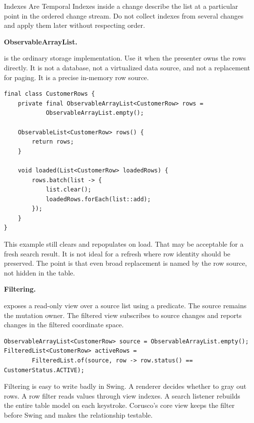 \begin{pitfallbox}{Indexes Are Temporal}
Indexes inside a change describe the list at a particular point in the ordered
change stream. Do not collect indexes from several changes and apply them later
without respecting order.
\end{pitfallbox}

\textbf{ObservableArrayList.}

 is the ordinary storage implementation. Use it when
the presenter owns the rows directly. It is not a database, not a virtualized
data source, and not a replacement for paging. It is a precise in-memory row
source.

\begin{lstlisting}[caption={Presenter-owned row storage.}]
final class CustomerRows {
    private final ObservableArrayList<CustomerRow> rows =
            ObservableArrayList.empty();

    ObservableList<CustomerRow> rows() {
        return rows;
    }

    void loaded(List<CustomerRow> loadedRows) {
        rows.batch(list -> {
            list.clear();
            loadedRows.forEach(list::add);
        });
    }
}
\end{lstlisting}

This example still clears and repopulates on load. That may be acceptable for a
fresh search result. It is not ideal for a refresh where row identity should be
preserved. The point is that even broad replacement is named by the row source,
not hidden in the table.

\textbf{Filtering.}

 exposes a read-only view over a source list using a
predicate. The source remains the mutation owner. The filtered view subscribes
to source changes and reports changes in the filtered coordinate space.

\begin{lstlisting}[caption={Filtered view over a source list.}]
ObservableArrayList<CustomerRow> source = ObservableArrayList.empty();
FilteredList<CustomerRow> activeRows =
        FilteredList.of(source, row -> row.status() == CustomerStatus.ACTIVE);
\end{lstlisting}

Filtering is easy to write badly in Swing. A renderer decides whether to gray
out rows. A row filter reads values through view indexes. A search listener
rebuilds the entire table model on each keystroke. Corusco's core view keeps
the filter before Swing and makes the relationship testable.

